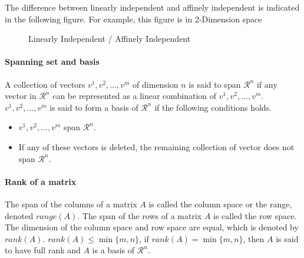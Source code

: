                     The difference between linearly independent and affinely independent is indicated in the following figure. For example, this figure is in 2-Dimension space
                    \begin{figure}[h]
                        \centering
                        \caption{Linearly Independent / Affinely Independent}
                    \end{figure}

                \paragraph{Spanning set and basis}
                    A collection of vectors $v^1, v^2, \dots, v^m$ of dimension $n$ is said to span $\mathcal{R}^n$ if any vector in $\mathcal{R}^n$ can be represented as a linear combination of $v^1, v^2, \dots, v^m$. $v^1, v^2, \dots, v^m$ is said to form a basis of $\mathcal{R}^n$ if the following conditions holds.
                    \begin{itemize}
                        \item $v^1, v^2, \dots, v^m$ span $\mathcal{R}^n$.
                        \item If any of these vectors is deleted, the remaining collection of vector does not span $\mathcal{R}^n$.
                    \end{itemize}

                \paragraph{Rank of a matrix}
                    The span of the columns of a matrix $A$ is called the column space or the range, denoted $range(A)$. The span of the rows of a matrix $A$ is called the row space. The dimension of the column space and row space are equal, which is denoted by $rank(A)$. $rank(A) \le \min\{m,n\}$, if $rank(A) = \min\{m,n\}$, then $A$ is said to have full rank and $A$ is a basis of $\mathcal{R}^n$.

